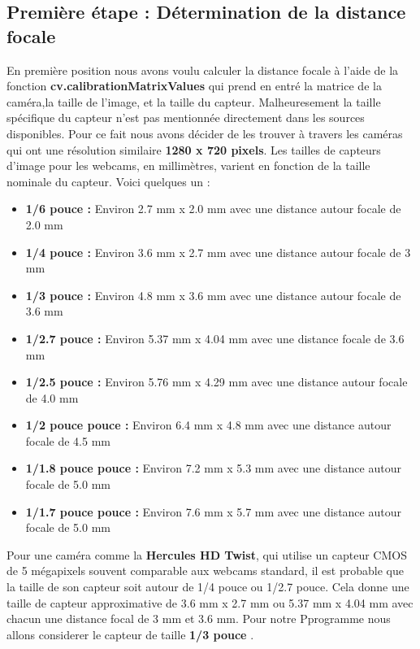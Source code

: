 \subsection{Première étape : Détermination de la distance focale} 
 
 En première position nous avons voulu calculer la distance focale à l'aide de la fonction \textbf{cv.calibrationMatrixValues} qui prend en entré la matrice de la caméra,la taille de l’image, et la taille du capteur. Malheuresement la taille spécifique du capteur n'est pas mentionnée directement dans les sources disponibles.
 Pour ce fait nous avons décider de les trouver à travers les caméras qui ont une résolution similaire \textbf{1280 x 720 pixels}.
 Les tailles de capteurs d'image pour les webcams, en millimètres, varient en fonction de la taille nominale du capteur. Voici quelques un :
 
 \begin{itemize}
 	\item \textbf{1/6 pouce :} Environ 2.7 mm x 2.0 mm avec une distance autour focale de 2.0 mm
 	
 	\item \textbf{1/4 pouce :} Environ 3.6 mm x 2.7 mm avec une distance autour focale de 3 mm
 	
 	\item \textbf{1/3 pouce :} Environ 4.8 mm x 3.6 mm avec une distance autour focale de 3.6 mm
 	
 	\item \textbf{1/2.7 pouce :} Environ 5.37 mm x 4.04 mm avec une distance focale de 3.6 mm
 	
 	\item \textbf{1/2.5 pouce :} Environ 5.76 mm x 4.29 mm avec une distance autour focale de 4.0 mm
 	
 	\item \textbf{1/2 pouce pouce :} Environ 6.4 mm x 4.8 mm avec une distance autour focale de 4.5 mm
 	
 	\item \textbf{1/1.8 pouce pouce :} Environ 7.2 mm x 5.3 mm avec une distance autour focale de 5.0 mm
 	
 	\item \textbf{1/1.7 pouce pouce :} Environ 7.6 mm x 5.7 mm avec une distance autour focale de 5.0 mm
 	 
 \end{itemize}
 
 Pour une caméra comme la \textbf{Hercules HD Twist}, qui utilise un capteur {CMOS de 5 mégapixels} souvent comparable aux webcams standard, il est probable que la taille de son capteur soit autour de 1/4 pouce ou 1/2.7 pouce. Cela donne une taille de capteur approximative de 3.6 mm x 2.7 mm ou 5.37 mm x 4.04 mm avec chacun une distance focal de 3 mm et 
 3.6 mm.
 Pour notre Pprogramme nous allons considerer le capteur de taille \textbf{1/3 pouce} .
  
